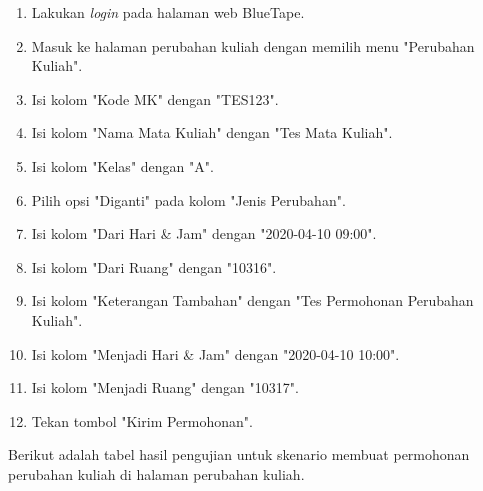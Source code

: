 \begin{enumerate}
    \item Lakukan \textit{login} pada halaman web BlueTape.
    \item Masuk ke halaman perubahan kuliah dengan memilih menu "Perubahan Kuliah".
    \item Isi kolom "Kode MK" dengan "TES123".
    \item Isi kolom "Nama Mata Kuliah" dengan "Tes Mata Kuliah".
    \item Isi kolom "Kelas" dengan "A".
    \item Pilih opsi "Diganti" pada kolom "Jenis Perubahan".
    \item Isi kolom "Dari Hari \& Jam" dengan "2020-04-10 09:00".
    \item Isi kolom "Dari Ruang" dengan "10316".
    \item Isi kolom "Keterangan Tambahan" dengan "Tes Permohonan Perubahan Kuliah".
    \item Isi kolom "Menjadi Hari \& Jam" dengan "2020-04-10 10:00".
    \item Isi kolom "Menjadi Ruang" dengan "10317".
    \item Tekan tombol "Kirim Permohonan".
\end{enumerate}

Berikut adalah tabel hasil pengujian untuk skenario membuat permohonan perubahan kuliah di halaman perubahan kuliah.

